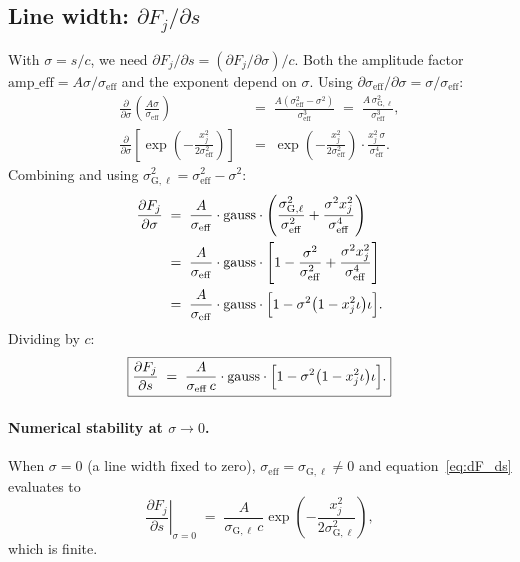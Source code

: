 \documentclass[12pt]{article}
\newcommand{\sGl}{\sigma_{\mathrm{G},\ell}}   %
\newcommand{\seff}{\sigma_{\mathrm{eff}}}
\newcommand{\C}{c}                             %
\begin{document}

\subsection{Line width: \texorpdfstring{$\partial F_j/\partial s$}{dF/ds}}
\label{ssec:dFds}

With $\sigma = s/\C$, we need $\partial F_j/\partial s =
(\partial F_j/\partial \sigma)/\C$.  Both the amplitude factor
$\text{amp\_eff} = A\sigma/\seff$ and the exponent depend on $\sigma$.
Using $\partial\seff/\partial\sigma = \sigma/\seff$:
\begin{align}
  \frac{\partial}{\partial\sigma}\!\left(\frac{A\sigma}{\seff}\right)
  &\;=\;
  \frac{A(\seff^2 - \sigma^2)}{\seff^3}
  \;=\;
  \frac{A\,\sGl^2}{\seff^3},
  \\[6pt]
  \frac{\partial}{\partial\sigma}\!
  \left[\exp\!\left(-\frac{x_j^2}{2\seff^2}\right)\right]
  &\;=\;
  \exp\!\left(-\frac{x_j^2}{2\seff^2}\right)
  \cdot\frac{x_j^2\,\sigma}{\seff^4}.
\end{align}
Combining and using $\sGl^2 = \seff^2 - \sigma^2$:
\begin{align}
  \frac{\partial F_j}{\partial\sigma}
  &\;=\;
  \frac{A}{\seff}\cdot\text{gauss}\cdot
  \left(\frac{\sGl^2}{\seff^2} + \frac{\sigma^2 x_j^2}{\seff^4}\right)
  \nonumber\\
  &\;=\;
  \frac{A}{\seff}\cdot\text{gauss}\cdot
  \left[1 - \frac{\sigma^2}{\seff^2} + \frac{\sigma^2 x_j^2}{\seff^4}\right]
  \nonumber\\
  &\;=\;
  \frac{A}{\seff}\cdot\text{gauss}\cdot
  \Bigl[1 - \sigma^2\bigl(1 - x_j^2\iota\bigr)\iota\Bigr].
\end{align}
Dividing by $\C$:
\begin{equation}
  \boxed{
  \frac{\partial F_j}{\partial s}
  \;=\;
  \frac{A}{\seff\,\C}\cdot\text{gauss}\cdot
  \Bigl[1 - \sigma^2\bigl(1 - x_j^2\iota\bigr)\iota\Bigr].
  }
  \label{eq:dF_ds}
\end{equation}

\paragraph{Numerical stability at $\sigma\to 0$.}
When $\sigma = 0$ (a line width fixed to zero), $\seff = \sGl \neq 0$ and
equation~\eqref{eq:dF_ds} evaluates to
\begin{equation}
  \left.\frac{\partial F_j}{\partial s}\right|_{\sigma=0}
  \;=\;
  \frac{A}{\sGl\,\C}
  \exp\!\left(-\frac{x_j^2}{2\sGl^2}\right),
\end{equation}
which is finite.
\end{document}

